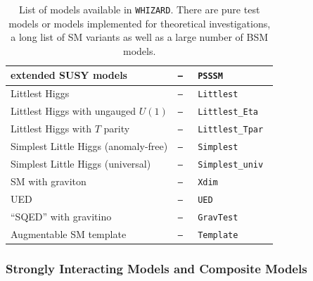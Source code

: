 \documentclass[12pt]{book}
\newcommand{\ttt}[1]{\texttt{#1}}
\newcommand{\whizard}{\ttt{WHIZARD}}
\begin{document}
\begin{table}
\begin{center}
\begin{tabular}{|l|l|l|}
             \hline
             extended SUSY models &   \tt{---} & \tt{PSSSM} \\
             \hline\hline
             Littlest Higgs &  \tt{---} & \tt{Littlest} \\
             \hline
             Littlest Higgs with ungauged $U(1)$ &  \tt{---} &
             \tt{Littlest\_Eta} \\
             \hline
             Littlest Higgs with $T$ parity &  \tt{---} &
             \tt{Littlest\_Tpar} \\
             \hline
             Simplest Little Higgs (anomaly-free) &  \tt{---} &
             \tt{Simplest} \\
             \hline
             Simplest Little Higgs (universal) &  \tt{---} &
             \tt{Simplest\_univ} \\
             \hline\hline
             SM with graviton & \tt{---} & \tt{Xdim} \\
             \hline
             UED & \tt{---} & \tt{UED} \\
             \hline
             ``SQED'' with gravitino & \tt{---} & \tt{GravTest} \\
             \hline
             Augmentable SM template & \tt{---} & \tt{Template} \\
             \hline
           \end{tabular}
         \end{center}
  \caption{\label{tab:models} List of models available in
          \whizard. There are pure test models or models implemented
          for theoretical investigations, a long list of SM variants
          as well as a large number of BSM models.}
\end{table}

\subsubsection{Strongly Interacting Models and Composite Models}
\end{document}
